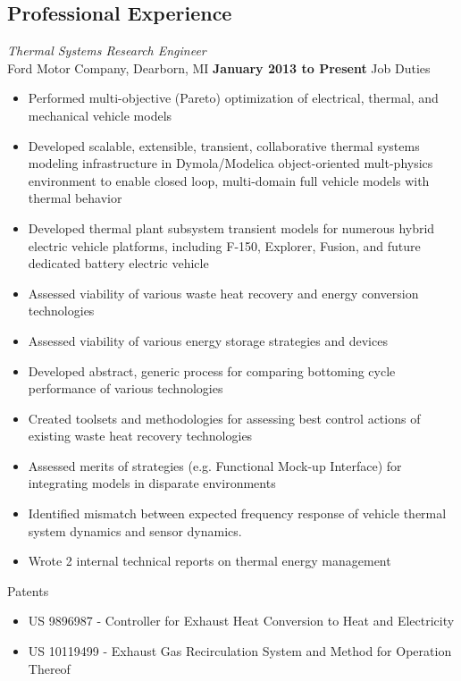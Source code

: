 \documentclass[centered]{res}
\begin{document}
\begin{resume}
\section{Professional Experience}
\textit{Thermal Systems Research Engineer} \\
Ford Motor Company, Dearborn, MI
\hfill \textbf{January 2013 to Present} 
\newline Job Duties
\begin{itemize} \itemsep -2pt %
\item Performed multi-objective (Pareto) optimization of electrical,
  thermal, and mechanical vehicle models
\item Developed scalable, extensible, transient, collaborative thermal
  systems modeling infrastructure in Dymola/Modelica object-oriented
  mult-physics environment to enable closed loop, multi-domain full
  vehicle models with thermal behavior
\item Developed thermal plant subsystem transient models for numerous
  hybrid electric vehicle platforms, including F-150, Explorer,
  Fusion, and future dedicated battery electric vehicle
\item Assessed viability of various waste heat recovery and energy
  conversion technologies
\item Assessed viability of various energy storage strategies and devices
\item Developed abstract, generic process for comparing bottoming
  cycle performance of various technologies
\item Created toolsets and methodologies for assessing best control
  actions of existing waste heat recovery technologies
\item Assessed merits of strategies (e.g. Functional Mock-up
  Interface) for integrating models in disparate environments
\item Identified mismatch between expected frequency response of
  vehicle thermal system dynamics and sensor dynamics.
\item Wrote 2 internal technical reports on thermal energy management
\end{itemize} \vspace{-8pt} 
\newpage
Patents
\begin{itemize} \itemsep -2pt %
\item US 9896987 - Controller for Exhaust Heat Conversion to Heat and Electricity
\item US 10119499 - Exhaust Gas Recirculation System and Method for Operation Thereof

\end{itemize}
\end{resume}
\end{document}
